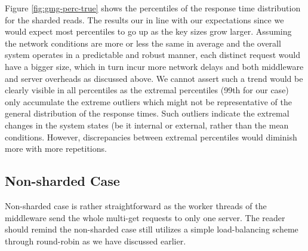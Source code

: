 \documentclass[11pt,a4paper]{article}
\begin{document}
Figure \ref{fig:gmg-perc-true} shows the percentiles of the response time distribution for the sharded reads. The results our in line with our expectations since we would expect most percentiles to go up as the key sizes grow larger. Assuming the network conditions are more or less the same in average and the overall system operates in a predictable and robust manner, each distinct request would have a bigger size, which in turn incur more network delays and both middleware and server overheads as discussed above. We cannot assert such a trend would be clearly visible in all percentiles as the extremal percentiles (99th for our case) only accumulate the extreme outliers which might not be representative of the general distribution of the response times. Such outliers indicate the extremal changes in the system states (be it internal or external, rather than the mean conditions. However, discrepancies between extremal percentiles would diminish more with more repetitions.

\subsection{Non-sharded Case} \label{sec:gmg-false}
Non-sharded case is rather straightforward as the worker threads of the middleware send the whole multi-get requests to only one server. The reader should remind the non-sharded case still utilizes a simple load-balancing scheme through round-robin as we have discussed earlier.
\end{document}
